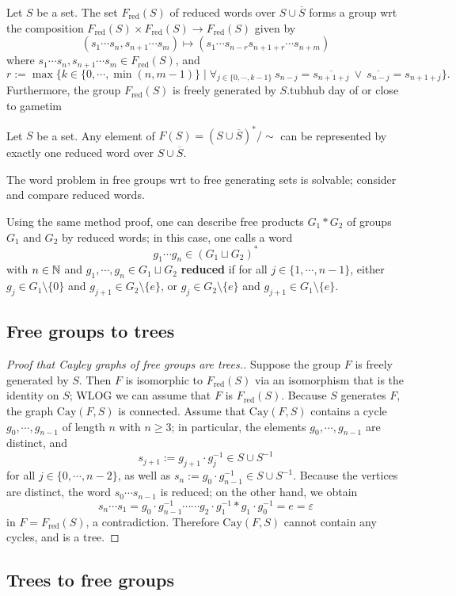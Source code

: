 \begin{prop}
    Let $S$ be a set. The set $F_{\mathrm{red}}(S)$ of reduced words over $S \cup \overline{S}$ forms a group wrt the composition $F_{\mathrm{red}}(S) \times F _{\mathrm{red}}(S) \to F_{\mathrm{red}}(S)$ given by \[
        (s_1 \cdots s_n ,s_{n+1}\cdots s_m) \mapsto  (s_1 \cdots s_{n-r}s _{n+1+r}\cdots s_{n+m})
    \] where $s_1 \cdots s_n , s_{n+1}\cdots s_m \in F _{\mathrm{red}}(S)$, and \[
    r:= \max \{k \in \{0, \cdots ,\min(n,m-1)\} \mid \forall _{j \in \{0,\cdots ,k-1\} }\ s_{n-j}= \overline{s _{n+1+j}} \ \vee \  \overline{ s _{n-j}}= s _{n+1+j}\} .
\] Furthermore, the group $F _{\mathrm{red}}(S)$ is freely generated by $S$.tubhub day of or close to gametim
\end{prop}
\begin{cor}
    Let $S$ be a set. Any element of $F(S) = (S \cup \overline{S}) ^* / \sim $ can be represented by exactly one reduced word over $S \cup \overline{S}$.
\end{cor}
\begin{cor}
    The word problem in free groups wrt to free generating sets is solvable; consider and compare reduced words.
\end{cor}
\begin{remark}
    Using the same method proof, one can describe free products $G_1 *G_2$ of groups $G_1$ and $G_2$ by reduced words; in this case, one calls a word  \[
        g_1 \cdots g_n  \in (G_1 \sqcup G_2)^*
    \] with $n \in \mathbb{N}$ and $g_1 ,\cdots ,g_n  \in G_1 \sqcup G_2$ \textbf{reduced} if for all $j \in \{1, \cdots ,n-1\} $, either $g_j  \in G_1 \setminus \{0\} $ and $g _{j+1} \in G_2 \setminus \{e\} $, or $g_j  \in G_2 \setminus \{e\} $ and $g_{j+1} \in G_1 \setminus \{e\} $.
\end{remark}

\subsection{Free groups to trees}
\begin{proof}[Proof that Cayley graphs of free groups are trees.]
    Suppose the group $F$ is freely generated by $S$. Then $F$ is isomorphic to $F_{\mathrm{red}}(S)$ via an isomorphism that is the identity on $S$; WLOG we can assume that $F$ is $F_{\mathrm{red}}(S)$. Because $S$ generates $F$, the graph $\mathrm{Cay}(F,S)$ is connected. Assume that $\mathrm{Cay}(F,S)$ contains a cycle $g_0,\cdots ,g_{n-1}$ of length $n$ with $n\geq 3$; in particular, the elements $g_0, \cdots ,g_{n-1}$ are distinct, and \[
        s _{j+1}:= g_{j+1} \cdot  g_j ^{-1} \in S \cup S^{-1}
    \] for all $j \in \{0,\cdots ,n-2\} $, as well as  $s _n := g_0 \cdot g_{n-1}^{-1} \in S \cup S^{-1}$. Because the vertices are distinct, the word $s_0 \cdots s_{n-1}$ is reduced; on the other hand, we obtain \[
    s _n \cdots s_1 = g_0 \cdot g_{n-1}^{-1} \cdots  \cdots g_2 \cdot g_1 ^{-1} *g_1 \cdot g_0 ^{-1} = e = \varepsilon 
\] in $F= F_{\mathrm{red}}(S)$, a contradiction. Therefore $\mathrm{Cay}(F,S)$ cannot contain any cycles, and is a tree.
\end{proof}

\subsection{Trees to free groups}

